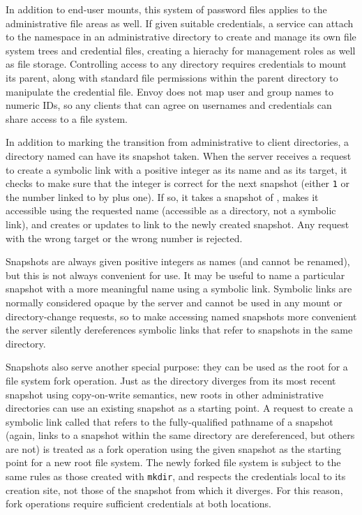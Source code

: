 In addition to end-user mounts, this system of password files applies to the administrative file areas as well. If given suitable credentials, a service can attach to the namespace in an administrative directory to create and manage its own file system trees and credential files, creating a hierachy for management roles as well as file storage. Controlling access to any directory requires credentials to mount its parent, along with standard file permissions within the parent directory to manipulate the credential file. Envoy does not map user and group names to numeric IDs, so any clients that can agree on usernames and credentials can share access to a file system.

In addition to marking the transition from administrative to client directories, a directory named \current can have its snapshot taken. When the server receives a request to create a symbolic link with a positive integer as its name and \current as its target, it checks to make sure that the integer is correct for the next snapshot (either \texttt{1} or the number linked to by \snapshot plus one). If so, it takes a snapshot of \current, makes it accessible using the requested name (accessible as a directory, not a symbolic link), and creates or updates \snapshot to link to the newly created snapshot. Any request with the wrong target or the wrong number is rejected.

Snapshots are always given positive integers as names (and cannot be renamed), but this is not always convenient for use. It may be useful to name a particular snapshot with a more meaningful name using a symbolic link. Symbolic links are normally considered opaque by the server and cannot be used in any mount or directory-change requests, so to make accessing named snapshots more convenient the server silently dereferences symbolic links that refer to snapshots in the same directory.

Snapshots also serve another special purpose: they can be used as the root for a file system fork operation. Just as the \current directory diverges from its most recent snapshot using copy-on-write semantics, new \current roots in other administrative directories can use an existing snapshot as a starting point. A request to create a symbolic link called \current that refers to the fully-qualified pathname of a snapshot (again, links to a snapshot within the same directory are dereferenced, but others are not) is treated as a fork operation using the given snapshot as the starting point for a new root file system. The newly forked file system is subject to the same rules as those created with \texttt{mkdir}, and respects the credentials local to its creation site, not those of the snapshot from which it diverges. For this reason, fork operations require sufficient credentials at both locations.

